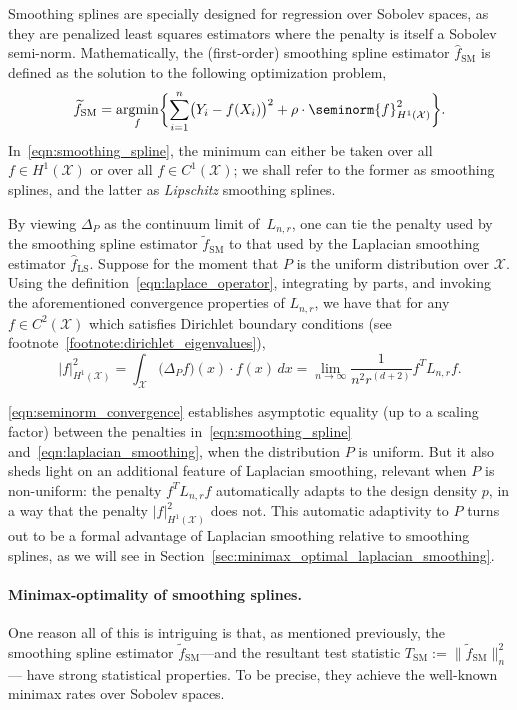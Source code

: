 \documentclass{article}
\newcommand{\abs}[1]{\left \lvert #1 \right \rvert}
\newcommand{\1}{\mathbf{1}}
\DeclareMathOperator*{\argmin}{argmin}
\newcommand{\Lap}{L}
\newcommand{\Xset}{\mathcal{X}}
\newcommand{\wt}[1]{\widetilde{#1}}
\newcommand{\wh}[1]{\widehat{#1}}
\newcommand{\LS}{\mathrm{LS}}
\newcommand{\SM}{\mathrm{SM}}
\theoremstyle{alden}
\theoremstyle{aldenthm}
\theoremstyle{definition}
\theoremstyle{remark}
\begin{document}
Smoothing splines are specially designed for regression over Sobolev spaces, as they are penalized least squares estimators where the penalty is itself a Sobolev semi-norm. Mathematically, the (first-order) smoothing spline estimator $\wh{f}_{\SM}$ is defined as the solution to the following optimization problem,
\begin{equation}
\label{eqn:smoothing_spline}
\wt{f}_{\SM} = \argmin_{f} \biggl\{\sum_{i = 1}^{n} \bigl(Y_i - f(X_i)\bigr)^2 + \rho \cdot \seminorm{f}_{H^{1}(\Xset)}^2\biggr\}.
\end{equation}
In~\eqref{eqn:smoothing_spline}, the minimum can either be taken over all $f \in H^1(\Xset)$ or over all $f \in C^1(\Xset)$; we shall refer to the former as smoothing splines, and the latter as \emph{Lipschitz} smoothing splines.

By viewing $\Delta_P$ as the continuum limit of~$\Lap_{n,r}$, one can tie the penalty used by the smoothing spline estimator $\wt{f}_{\SM}$ to that used by the Laplacian smoothing estimator $\wh{f}_{\LS}$. Suppose for the moment that $P$ is the uniform distribution over $\Xset$. Using the definition~\eqref{eqn:laplace_operator}, integrating by parts, and invoking the aforementioned convergence properties of $\Lap_{n,r}$, we have that for any $f \in C^{2}(\Xset)$ which satisfies Dirichlet boundary conditions (see footnote~\ref{footnote:dirichlet_eigenvalues}),
\begin{equation}
\label{eqn:seminorm_convergence}
\abs{f}_{H^1(\Xset)}^2 = \int_{\Xset} \bigl(\Delta_P f\bigr)(x) \cdot f(x) \,dx = \lim_{n \to \infty} \frac{1}{n^{2}r^{(d + 2)}}f^T \Lap_{n,r} f.
\end{equation}

\eqref{eqn:seminorm_convergence} establishes asymptotic equality (up to a scaling factor) between the penalties in~\eqref{eqn:smoothing_spline} and~\eqref{eqn:laplacian_smoothing}, when the distribution $P$ is uniform. But it also sheds light on an additional feature of Laplacian smoothing, relevant when $P$ is non-uniform: the penalty $f^T \Lap_{n,r} f$ automatically adapts to the design density $p$, in a way that the penalty $|f|_{H^1(\Xset)}^2$ does not. This automatic adaptivity to $P$ turns out to be a formal advantage of Laplacian smoothing relative to smoothing splines, as we will see in Section~\ref{sec:minimax_optimal_laplacian_smoothing}.

\paragraph{Minimax-optimality of smoothing splines.} 
One reason all of this is intriguing is that, as mentioned previously, the smoothing spline estimator $\wt{f}_{\SM}$---and the resultant test statistic $T_{\SM} := \|\wt{f}_{\SM}\|_n^2$--- have strong statistical properties. To be precise, they achieve the well-known minimax rates over Sobolev spaces.
\end{document}
